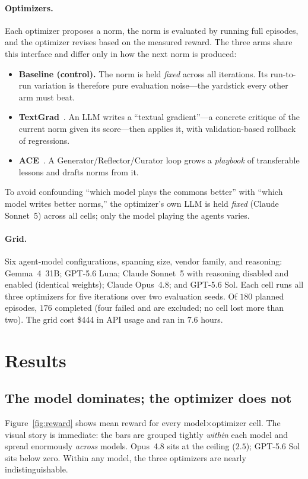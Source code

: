\documentclass[11pt]{article}
\begin{document}
\paragraph{Optimizers.}
Each optimizer proposes a norm, the norm is evaluated by running full episodes, and
the optimizer revises based on the measured reward. The three arms share this
interface and differ only in how the next norm is produced:
\begin{itemize}
  \item \textbf{Baseline (control).} The norm is held \emph{fixed} across all
  iterations. Its run-to-run variation is therefore pure evaluation noise---the
  yardstick every other arm must beat.
  \item \textbf{TextGrad}~\citep{textgrad}. An LLM writes a ``textual gradient''---a
  concrete critique of the current norm given its score---then applies it, with
  validation-based rollback of regressions.
  \item \textbf{ACE}~\citep{ace}. A Generator/Reflector/Curator loop grows a
  \emph{playbook} of transferable lessons and drafts norms from it.
\end{itemize}
To avoid confounding ``which model plays the commons better'' with ``which model
writes better norms,'' the optimizer's own LLM is held \emph{fixed} (Claude
Sonnet~5) across all cells; only the model playing the agents varies.

\paragraph{Grid.}
Six agent-model configurations, spanning size, vendor family, and reasoning:
Gemma~4~31B; GPT-5.6 Luna; Claude Sonnet~5 with reasoning disabled and enabled
(identical weights); Claude Opus~4.8; and GPT-5.6 Sol. Each cell runs all three
optimizers for five iterations over two evaluation seeds. Of $180$ planned
episodes, $176$ completed (four failed and are excluded; no cell lost more than
two). The grid cost \$444 in API usage and ran in $7.6$ hours.

\section{Results}

\subsection{The model dominates; the optimizer does not}
Figure~\ref{fig:reward} shows mean reward for every model$\times$optimizer cell.
The visual story is immediate: the bars are grouped tightly \emph{within} each
model and spread enormously \emph{across} models. Opus~4.8 sits at the ceiling
($2.5$); GPT-5.6 Sol sits below zero. Within any model, the three optimizers are
nearly indistinguishable.
\end{document}
